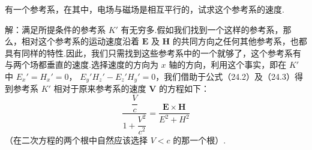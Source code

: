 \begin{xiti}

\quad 有一个参考系，在其中，电场与磁场是相互平行的，试求这个参考系的速度.

解：满足所提条件的参考系 $K'$ 有无穷多.假如我们找到一个这样的参考系，那么，相对这个参考系的运动速度沿着
$\boldsymbol{E}$ 及 $\boldsymbol{H}$
的共同方向之任何其他参考系，也都具有同样的特性.因此，我们只需找到这些参考系中的一个就够了，这个参考系有与两个场都垂直的速度.选择速度的方向为
$x$ 轴的方向，利用这个事实，即在 $K'$ 中 $E_x'=H_x'=0$，
$E_y'H_z'-E_z'H_y'=0$，我们借助于公式（24.2）及（24.3）得到参考系 $K'$ 相对于原来参考系的速度
$\boldsymbol{V}$ 的方程如下：
\begin{equation*}
  \frac{\dfrac{V}{c}}{1+\dfrac{V^2}{c^2}}
  =\frac{\boldsymbol{E}\times\boldsymbol{H}}{E^2+H^2}
\end{equation*}
（在二次方程的两个根中自然应该选择 $V<c$ 的那一个根）.

\end{xiti}

